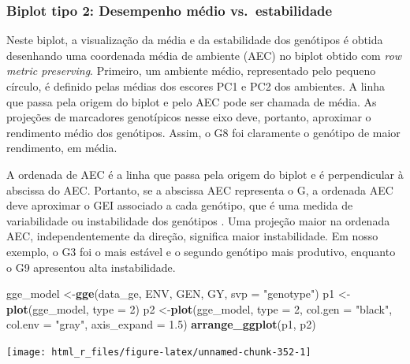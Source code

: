 \documentclass[
]{book}
\newenvironment{Shaded}{\begin{snugshade}}{\end{snugshade}}
\newcommand{\DataTypeTok}[1]{\textcolor[rgb]{0.13,0.29,0.53}{#1}}
\newcommand{\DecValTok}[1]{\textcolor[rgb]{0.00,0.00,0.81}{#1}}
\newcommand{\FloatTok}[1]{\textcolor[rgb]{0.00,0.00,0.81}{#1}}
\newcommand{\KeywordTok}[1]{\textcolor[rgb]{0.13,0.29,0.53}{\textbf{#1}}}
\newcommand{\NormalTok}[1]{#1}
\newcommand{\StringTok}[1]{\textcolor[rgb]{0.31,0.60,0.02}{#1}}
\begin{document}
\hypertarget{biplot-tipo-2-desempenho-muxe9dio-vs.-estabilidade}{%
\subsubsection{Biplot tipo 2: Desempenho médio vs.~estabilidade}\label{biplot-tipo-2-desempenho-muxe9dio-vs.-estabilidade}}

Neste biplot, a visualização da média e da estabilidade dos genótipos é obtida desenhando uma coordenada média de ambiente (AEC) no biplot obtido com \emph{row metric preserving}. Primeiro, um ambiente médio, representado pelo pequeno círculo, é definido pelas médias dos escores PC1 e PC2 dos ambientes. A linha que passa pela origem do biplot e pelo AEC pode ser chamada de média. As projeções de marcadores genotípicos nesse eixo deve, portanto, aproximar o rendimento médio dos genótipos. Assim, o G8 foi claramente o genótipo de maior rendimento, em média.

A ordenada de AEC é a linha que passa pela origem do biplot e é perpendicular à abscissa do AEC. Portanto, se a abscissa AEC representa o G, a ordenada AEC deve aproximar o GEI associado a cada genótipo, que é uma medida de variabilidade ou instabilidade dos genótipos \citep{Yan2007}. Uma projeção maior na ordenada AEC, independentemente da direção, significa maior instabilidade. Em nosso exemplo, o G3 foi o mais estável e o segundo genótipo mais produtivo, enquanto o G9 apresentou alta instabilidade.

\begin{Shaded}
\begin{Highlighting}[]
\NormalTok{gge_model <-}\KeywordTok{gge}\NormalTok{(data_ge, ENV, GEN, GY, }\DataTypeTok{svp =} \StringTok{"genotype"}\NormalTok{)}
\NormalTok{p1 <-}\KeywordTok{plot}\NormalTok{(gge_model, }\DataTypeTok{type =} \DecValTok{2}\NormalTok{)}
\NormalTok{p2 <-}\KeywordTok{plot}\NormalTok{(gge_model,}
          \DataTypeTok{type =} \DecValTok{2}\NormalTok{,}
          \DataTypeTok{col.gen =} \StringTok{"black"}\NormalTok{,}
          \DataTypeTok{col.env =} \StringTok{"gray"}\NormalTok{,}
          \DataTypeTok{axis_expand =} \FloatTok{1.5}\NormalTok{)}
\KeywordTok{arrange_ggplot}\NormalTok{(p1, p2)}
\end{Highlighting}
\end{Shaded}

\begin{center}\texttt{[image: html\_r\_files/figure-latex/unnamed-chunk-352-1]} \end{center}
\end{document}
